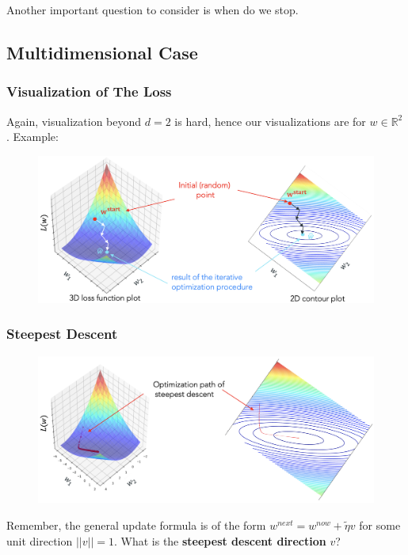\documentclass[a4paper]{extarticle}
\begin{document}
Another important question to consider is when do we stop. 

\subsection{Multidimensional Case}

\subsubsection{Visualization of The Loss}

Again, visualization beyond \(d = 2\) is hard, hence our visualizations are for \(w \in \mathbb{R}^2\). Example:

\begin{figure}[H]
    \includegraphics[width=15cm]{../images/IntroML_Fig2-1}
    \centering
\end{figure}

\subsubsection{Steepest Descent}

\begin{figure}[H]
    \includegraphics[width=15cm]{../images/IntroML_Fig2-2}
    \centering
\end{figure}

Remember, the general update formula is of the form \(w^{next} = w^{now} + \tilde{\eta}v\) for some unit direction \(||v|| = 1\). What is the \textbf{steepest descent direction} \(v\)?
\end{document}
